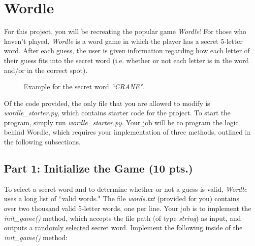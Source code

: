 \documentclass{article}
\begin{document}
\pagestyle{fancy}

\section{Wordle}
\hspace{\parindent}For this project, you will be recreating the popular game \emph{Wordle}! For those who haven't played, \emph{Wordle} is a word game in which the player has a secret 5-letter word. After each guess, the user is given information regarding how each letter of their guess fits into the secret word (i.e. whether or not each letter is in the word and/or in the correct spot).

\vspace{0.5cm}

\begin{figure}[h!]
    \centering
    \caption{Example for the secret word \emph{``CRANE"}.}
\end{figure}

\vspace{1cm}

Of the code provided, the only file that you are allowed to modify is \emph{wordle\_starter.py}, which contains starter code for the project. To start the program, simply run \emph{wordle\_starter.py}. Your job will be to program the logic behind Wordle, which requires your implementation of three methods, outlined in the following subsections.

\subsection{Part 1: Initialize the Game (10 pts.)}
\hspace{\parindent} To select a secret word and to determine whether or not a guess is valid, \emph{Wordle} uses a long list of ``valid words." The file \emph{words.txt} (provided for you) contains over two thousand valid 5-letter words, one per line. Your job is to implement the \emph{init\_game()} method, which accepts the file path  (of type \emph{string}) as input, and outputs a \underline{randomly selected} secret word. Implement the following inside of the \emph{init\_game()} method:
\end{document}
